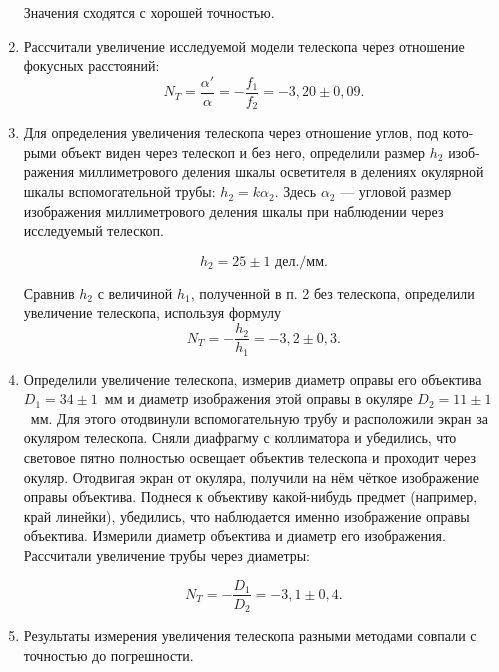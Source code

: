 \documentclass[a4paper,12pt]{article}
\begin{document}
\begin{enumerate}
		Значения сходятся с хорошей точностью.
		
		\item Рассчитали увеличение исследуемой модели телескопа через отношение фокусных расстояний:
		\begin{equation*}
		N_T = \dfrac{\alpha'}{\alpha} = -\dfrac{f_1}{f_2} = -3{,}20\pm0{,}09.
		\end{equation*}
		
		\item Для определения увеличения телескопа через отношение углов, под кото-
		рыми объект виден через телескоп и без него, определили размер $h_2$ изоб-
		ражения миллиметрового деления шкалы осветителя в делениях окулярной
		шкалы вспомогательной трубы: $h_2 = k\alpha_2$. Здесь $\alpha_2$ --- угловой размер изображения миллиметрового деления шкалы при наблюдении через исследуемый телескоп.
		
		\begin{equation*}
		h_2 = 25\pm1\text{ дел./мм}.
		\end{equation*}
		
		Сравнив $h_2$ с величиной $h_1$, полученной в п. 2 без телескопа, определили
		увеличение телескопа, используя формулу
		\begin{equation*}
		N_T = -\dfrac{h_2}{h_1} = -3{,}2\pm0{,}3.
		\end{equation*}
		 \item Определили увеличение телескопа, измерив диаметр оправы его объектива $D_1 = 34\pm1$~мм и диаметр изображения этой оправы в окуляре $D_2=11\pm1$~мм. Для этого отодвинули вспомогательную трубу и расположили экран за окуляром телескопа. Сняли диафрагму с коллиматора и убедились, что световое пятно полностью освещает объектив телескопа и проходит через окуляр. Отодвигая экран от окуляра, получили на нём чёткое изображение оправы объектива. Поднеся к объективу какой-нибудь предмет (например, край линейки), убедились, что наблюдается именно изображение оправы объектива. Измерили диаметр объектива и диаметр его изображения. Рассчитали увеличение трубы через диаметры:
		 
		 \begin{equation*}
		 N_T = -\dfrac{D_1}{D_2} = -3{,}1\pm 0{,}4.
		 \end{equation*}
		 
		 \item Результаты измерения увеличения телескопа разными методами совпали с точностью до погрешности.
	\end{enumerate}
\end{document}
